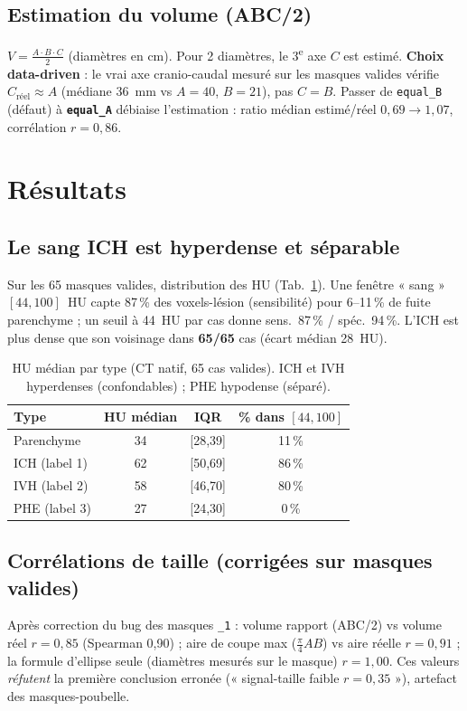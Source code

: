 \documentclass[11pt,a4paper]{article}
\begin{document}
\subsection{Estimation du volume (ABC/2)}
$V = \tfrac{A\cdot B\cdot C}{2}$ (diamètres en cm). Pour 2 diamètres, le 3\textsuperscript{e}
axe $C$ est estimé. \textbf{Choix data-driven} : le vrai axe cranio-caudal mesuré sur les
masques valides vérifie $C_{\text{réel}}\approx A$ (médiane 36~mm vs $A{=}40$, $B{=}21$),
pas $C{=}B$. Passer de \texttt{equal\_B} (défaut) à \textbf{\texttt{equal\_A}} débiaise
l'estimation : ratio médian estimé/réel $0{,}69 \rightarrow 1{,}07$, corrélation $r=0{,}86$.

\section{Résultats}

\subsection{Le sang ICH est hyperdense et séparable}
Sur les 65 masques valides, distribution des HU (Tab.~\ref{tab:hu}). Une fenêtre
« sang » $[44,100]$~HU capte 87\,\% des voxels-lésion (sensibilité) pour 6--11\,\% de fuite
parenchyme ; un seuil à 44~HU par cas donne sens.\ 87\,\% / spéc.\ 94\,\%. L'ICH est plus
dense que son voisinage dans \textbf{65/65} cas (écart médian 28~HU).

\begin{table}[h]\centering
\caption{HU médian par type (CT natif, 65 cas valides). ICH et IVH hyperdenses
(confondables) ; PHE hypodense (séparé).}
\label{tab:hu}
\begin{tabular}{lccc}
\toprule
Type & HU médian & IQR & \% dans $[44,100]$ \\
\midrule
Parenchyme       & 34 & [28,39] & 11\,\% \\
ICH (label 1)    & 62 & [50,69] & 86\,\% \\
IVH (label 2)    & 58 & [46,70] & 80\,\% \\
PHE (label 3)    & 27 & [24,30] &  0\,\% \\
\bottomrule
\end{tabular}
\end{table}

\subsection{Corrélations de taille (corrigées sur masques valides)}
Après correction du bug des masques \texttt{\_1} : volume rapport (ABC/2) vs volume réel
$r=0{,}85$ (Spearman 0,90) ; aire de coupe max ($\tfrac{\pi}{4}AB$) vs aire réelle
$r=0{,}91$ ; la formule d'ellipse seule (diamètres mesurés sur le masque) $r=1{,}00$.
Ces valeurs \emph{réfutent} la première conclusion erronée (« signal-taille faible $r=0{,}35$ »),
artefact des masques-poubelle.
\end{document}
